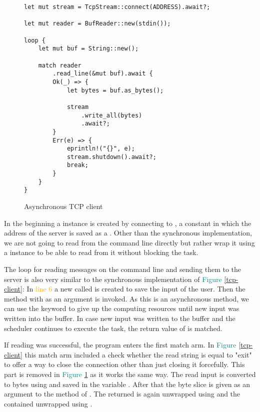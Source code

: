 \begin{figure}[ht]
    \begin{verbatim}
let mut stream = TcpStream::connect(ADDRESS).await?;

let mut reader = BufReader::new(stdin());

loop {
    let mut buf = String::new();

    match reader
        .read_line(&mut buf).await {
        Ok(_) => {
            let bytes = buf.as_bytes();

            stream
                .write_all(bytes)
                .await?;
        }
        Err(e) => {
            eprintln!("{}", e);
            stream.shutdown().await?;
            break;
        }
    }
}
    \end{verbatim}
    \caption{Asynchronous TCP client}
    \label{async-tcp-client}
\end{figure}

In the beginning a  instance is created by connecting to , a constant in
which the address of the server is saved as a . Other than the synchronous implementation, we are not going
to read from the command line directly but rather wrap it using a  instance to be able to
read from it without blocking the task.

The loop for reading messages on the command line and sending them to the server is also very similar to the
synchronous implementation of \textcolor{teal}{Figure \ref{tcp-client}}: In \textcolor{orange}{line 6} a new
 called  is created to save the input of the user. Then the  method with
 as an argument is invoked. As this is an asynchronous method, we can use the  keyword to give up
the computing resources until new input was written into the buffer. In case new input was written to the buffer and
the scheduler continues to execute the task, the return value of  is matched.

If reading was successful, the program enters the first match arm. In\textcolor{teal}{ Figure \ref{tcp-client}} this
match arm included a check whether the read string is equal to "exit" to offer a way to close the connection other than
just closing it forcefully. This part is removed in \textcolor{teal}{Figure \ref{async-tcp-client}} as it works the
same way. The read input is converted to bytes using  and saved in the variable . After that
the byte slice is given as an argument to the  method of . The returned  is
again unwrapped using  and the contained  unwrapped using .

